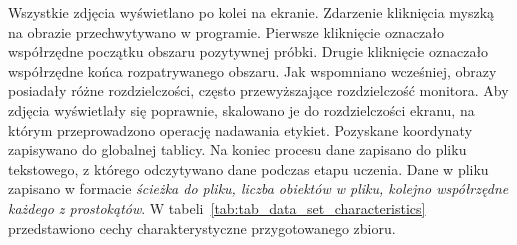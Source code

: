 %
%
Wszystkie zdjęcia wyświetlano po kolei na ekranie.
Zdarzenie kliknięcia myszką na obrazie przechwytywano w programie.
Pierwsze kliknięcie oznaczało współrzędne początku obszaru pozytywnej próbki.
Drugie kliknięcie oznaczało współrzędne końca rozpatrywanego obszaru.
Jak wspomniano wcześniej, obrazy posiadały różne rozdzielczości, często przewyższające rozdzielczość monitora.
Aby zdjęcia wyświetlały się poprawnie, skalowano je do rozdzielczości ekranu, na którym przeprowadzono operację nadawania etykiet.
Pozyskane koordynaty zapisywano do globalnej tablicy.
Na koniec procesu dane zapisano do pliku tekstowego, z którego odczytywano dane podczas etapu uczenia.
Dane w pliku zapisano w formacie \textit{ścieżka do pliku, liczba obiektów w pliku, kolejno współrzędne każdego z prostokątów}.
W tabeli~\ref{tab:tab_data_set_characteristics} przedstawiono cechy charakterystyczne przygotowanego zbioru.
